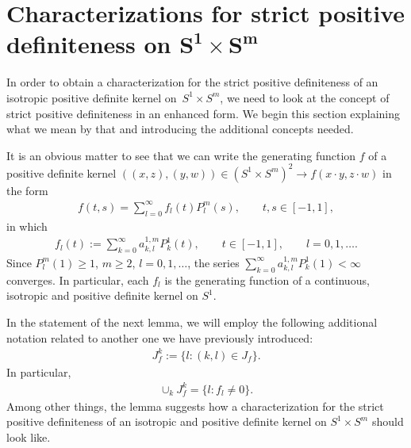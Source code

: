 \section[Characterizations for strict positive def\/initeness on $S^1 \times S^m$]{Characterizations for strict positive def\/initeness on $\boldsymbol{S^1 \times S^m}$}\label{section3}

In order to obtain a characterization for the strict positive def\/initeness of an isotropic positive def\/inite kernel on~$S^1 \times S^m$, we need to look at the concept of strict positive def\/initeness in an enhanced form. We begin this section explaining what we mean by that and introducing the additional concepts needed.

It is an obvious matter to see that we can write the generating function $f$ of a positive def\/inite kernel $((x,z), (y,w)) \in (S^1 \times S^m)^2 \to f(x \cdot y, z \cdot w)$ in the form
\begin{gather} \label{alter}
f(t,s)=\sum_{l=0}^{\infty}f_l(t)P_{l}^{m}(s), \qquad t,s \in [-1,1],
\end{gather}
in which
\begin{gather*}f_l(t):=\sum_{k=0}^\infty a_{k,l}^{1,m}P_{k}^1(t), \qquad t \in [-1,1],\qquad l=0,1,\ldots.\end{gather*}
Since $P_l^m(1)\geq 1$, $m\geq 2$, $l=0,1,\ldots$, the series $\sum\limits_{k=0}^\infty a_{k,l}^{1,m}P_{k}^1(1)<\infty$ converges. In particular, each $f_l$ is the generating function of a continuous, isotropic and positive def\/inite kernel on $S^1$.

In the statement of the next lemma, we will employ the following additional notation related to another one we have previously introduced:
\begin{gather*}J_{f}^k:=\{l\colon (k,l) \in J_f \}.\end{gather*}
In particular,
\begin{gather*}\cup_{k} J_f^k=\{l\colon f_l\neq 0\}.\end{gather*}
Among other things, the lemma suggests how a characterization for the strict positive def\/ini\-te\-ness of an isotropic and positive def\/inite kernel on $S^1 \times S^m$ should look like.

